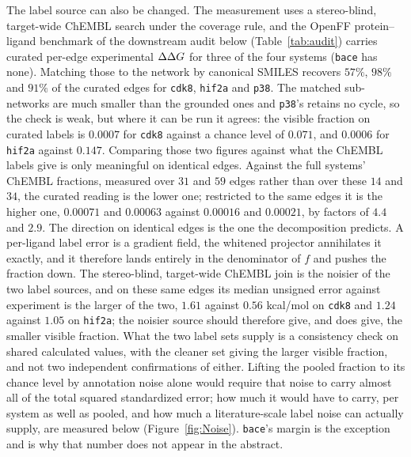 

The label source can also be changed. The measurement uses a stereo-blind, target-wide ChEMBL
search under the coverage rule, and the OpenFF protein--ligand benchmark of the downstream audit
below (Table~\ref{tab:audit}) carries curated
per-edge experimental $\Delta\Delta G$ for three of the four systems (\texttt{bace} has none). Matching those
to the network by canonical SMILES recovers $57\%$, $98\%$ and $91\%$ of the curated edges for
\texttt{cdk8}, \texttt{hif2a} and \texttt{p38}. The matched sub-networks are much smaller than the
grounded ones and \texttt{p38}'s retains no cycle, so the check is weak, but where it can be run it
agrees: the visible fraction on curated labels is $0.0007$ for \texttt{cdk8} against a chance level
of $0.071$, and $0.0006$ for \texttt{hif2a} against $0.147$. Comparing those two figures against
what the ChEMBL labels give is only meaningful on identical edges. Against the full systems'
ChEMBL fractions, measured over $31$ and $59$ edges rather than over these $14$ and $34$, the
curated reading is the lower one; restricted to the same edges it is the higher one, $0.00071$ and
$0.00063$ against $0.00016$ and $0.00021$, by factors of $4.4$ and $2.9$. The direction on
identical edges is the one the decomposition predicts. A per-ligand label error is a gradient
field, the whitened projector annihilates it exactly, and it therefore lands entirely in the
denominator of $f$ and pushes the fraction down. The stereo-blind, target-wide ChEMBL join is the
noisier of the two label sources, and on these same edges its median unsigned error against
experiment is the larger of the two, $1.61$ against $0.56$ kcal/mol on \texttt{cdk8} and $1.24$
against $1.05$ on \texttt{hif2a}; the noisier source should therefore give, and does give, the
smaller visible fraction. What the two label sets supply is a consistency check on shared
calculated values, with the cleaner set giving the larger visible fraction, and not two independent
confirmations of either. Lifting the pooled fraction to its chance level by annotation noise alone
would require that noise to carry almost all of the total squared standardized error; how much it
would have to carry, per system as well as pooled, and how much a literature-scale label noise can
actually supply, are measured below (Figure~\ref{fig:Noise}). \texttt{bace}'s margin is the
exception and is why that number does not appear in the abstract.

